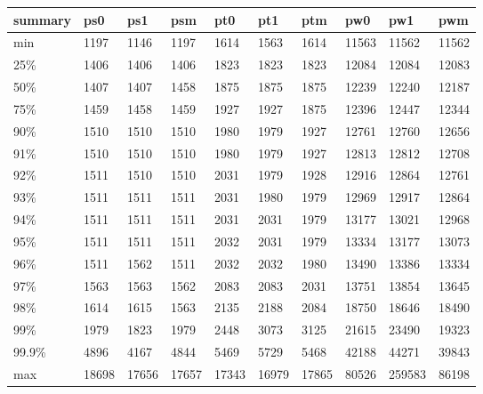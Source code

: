 \begin{tabular}{llllllllll}
\toprule
summary &    ps0 &    ps1 &    psm &    pt0 &    pt1 &    ptm &    pw0 &     pw1 &    pwm \\
\midrule
    min &   1197 &   1146 &   1197 &   1614 &   1563 &   1614 &  11563 &   11562 &  11562 \\
    25\% &   1406 &   1406 &   1406 &   1823 &   1823 &   1823 &  12084 &   12084 &  12083 \\
    50\% &   1407 &   1407 &   1458 &   1875 &   1875 &   1875 &  12239 &   12240 &  12187 \\
    75\% &   1459 &   1458 &   1459 &   1927 &   1927 &   1875 &  12396 &   12447 &  12344 \\
    90\% &   1510 &   1510 &   1510 &   1980 &   1979 &   1927 &  12761 &   12760 &  12656 \\
    91\% &   1510 &   1510 &   1510 &   1980 &   1979 &   1927 &  12813 &   12812 &  12708 \\
    92\% &   1511 &   1510 &   1510 &   2031 &   1979 &   1928 &  12916 &   12864 &  12761 \\
    93\% &   1511 &   1511 &   1511 &   2031 &   1980 &   1979 &  12969 &   12917 &  12864 \\
    94\% &   1511 &   1511 &   1511 &   2031 &   2031 &   1979 &  13177 &   13021 &  12968 \\
    95\% &   1511 &   1511 &   1511 &   2032 &   2031 &   1979 &  13334 &   13177 &  13073 \\
    96\% &   1511 &   1562 &   1511 &   2032 &   2032 &   1980 &  13490 &   13386 &  13334 \\
    97\% &   1563 &   1563 &   1562 &   2083 &   2083 &   2031 &  13751 &   13854 &  13645 \\
    98\% &   1614 &   1615 &   1563 &   2135 &   2188 &   2084 &  18750 &   18646 &  18490 \\
    99\% &   1979 &   1823 &   1979 &   2448 &   3073 &   3125 &  21615 &   23490 &  19323 \\
  99.9\% &   4896 &   4167 &   4844 &   5469 &   5729 &   5468 &  42188 &   44271 &  39843 \\
    max &  18698 &  17656 &  17657 &  17343 &  16979 &  17865 &  80526 &  259583 &  86198 \\
\bottomrule
\end{tabular}
